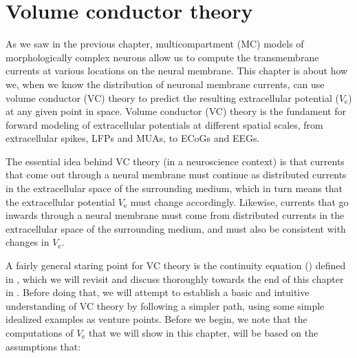 \chapter{Volume conductor theory}
\label{chap:VC} %
As we saw in the previous chapter, multicompartment (MC) models of morphologically complex neurons 
allow us to compute the transmembrane currents at various locations on the neural membrane. 
This chapter is about how we, when we know the distribution of neuronal membrane currents, 
can use volume conductor (VC) theory to predict the resulting extracellular potential ($V_\mathrm{e}$) 
at any given point in space. Volume conductor (VC) theory is the fundament for forward modeling 
of extracellular potentials at different spatial scales, from extracellular spikes, 
LFPs and MUAs, to ECoGs and EEGs. 

The essential idea behind VC theory (in a neuroscience context) is that currents that come 
out through a neural membrane must continue as distributed currents in the extracellular space 
of the surrounding medium, which in turn means that the extracellular potential $V_\mathrm{e}$ 
must change accordingly. Likewise, currents that go inwards through a neural membrane must come 
from distributed currents in the extracellular space of the surrounding medium, and must also be consistent 
with changes in $V_\mathrm{e}$. 

A fairly general staring point for VC theory is the continuity equation () 
defined in , which we will revisit and discuss thoroughly towards the end of this 
chapter in . Before doing that, we will attempt to establish a basic and intuitive 
understanding of VC theory by following a simpler path, using some simple idealized examples as venture points. 
Before we begin, we note that the computations of $V_\mathrm{e}$ that we will show in this chapter, 
will be based on the assumptions that:

